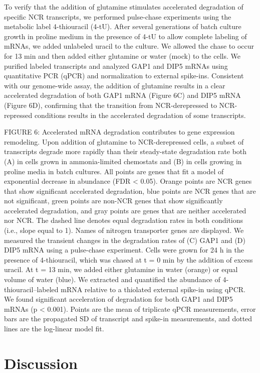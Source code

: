 To verify
that the addition of glutamine stimulates accelerated degradation of
specific NCR transcripts, we performed pulse-chase experiments using
the metabolic label 4-thiouracil (4-tU). After several generations of
batch culture growth in proline medium in the presence of 4-tU to
allow complete labeling of mRNAs, we added unlabeled uracil to the
culture. We allowed the chase to occur for 13 min and then added
either glutamine or water (mock) to the cells. We purified labeled
transcripts and analyzed GAP1 and DIP5 mRNAs using quantitative PCR
(qPCR) and normalization to external spike-ins. Consistent with our
genome-wide assay, the addition of glutamine results in a clear
accelerated degradation of both GAP1 mRNA (Figure 6C) and DIP5 mRNA
(Figure 6D), confirming that the transition from NCR-derepressed to
NCR-repressed conditions results in the accelerated degradation of
some transcripts.  

FIGURE 6: Accelerated mRNA degradation contributes
to gene expression remodeling. Upon addition of glutamine to
NCR-derepressed cells, a subset of transcripts degrade more rapidly
than their steady-state degradation rate both (A) in cells grown in
ammonia-limited chemostats and (B) in cells growing in proline media
in batch cultures. All points are genes that fit a model of
exponential decrease in abundance (FDR < 0.05). Orange points are NCR
genes that show significant accelerated degradation, blue points are
NCR genes that are not significant, green points are non-NCR genes
that show significantly accelerated degradation, and gray points are
genes that are neither accelerated nor NCR. The dashed line denotes
equal degradation rates in both conditions (i.e., slope equal to 1).
Names of nitrogen transporter genes are displayed. We measured the
transient changes in the degradation rates of (C) GAP1 and (D) DIP5
mRNA using a pulse-chase experiment. Cells were grown for 24 h in the
presence of 4-thiouracil, which was chased at t = 0 min by the
addition of excess uracil. At t = 13 min, we added either glutamine in
water (orange) or equal volume of water (blue). We extracted and
quantified the abundance of 4-thiouracil–labeled mRNA relative to a
thiolated external spike-in using qPCR. We found significant
acceleration of degradation for both GAP1 and DIP5 mRNAs (p < 0.001).
Points are the mean of triplicate qPCR measurements, error bars are
the propagated SD of transcript and spike-in measurements, and dotted
lines are the log-linear model fit.  

\section{Discussion} 


